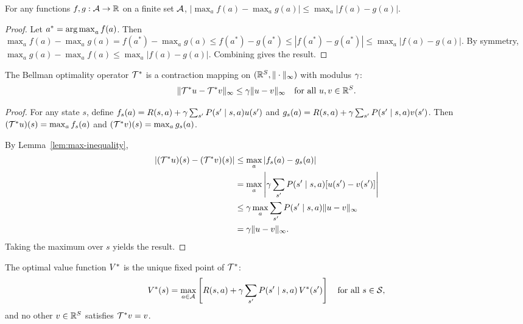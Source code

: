 \documentclass[11pt,a4paper]{article}
\begin{document}
\begin{lemma}
\label{lem:max-inequality}
For any functions $f, g : \mathcal{A} \to \mathbb{R}$ on a finite set $\mathcal{A}$,
$|\max_a f(a) - \max_a g(a)| \leq \max_a |f(a) - g(a)|$.
\end{lemma}

\begin{proof}
Let $a^* = \operatorname{arg\,max}_a f(a)$. Then
$\max_a f(a) - \max_a g(a) = f(a^*) - \max_a g(a) \leq
f(a^*) - g(a^*) \leq |f(a^*) - g(a^*)| \leq \max_a |f(a) - g(a)|$.
By symmetry, $\max_a g(a) - \max_a f(a) \leq \max_a |f(a) - g(a)|$.
Combining gives the result.
\end{proof}

\begin{theorem}
\label{thm:bellman-opt-contraction}
The Bellman optimality operator $\mathcal{T}^*$ is a contraction mapping
on $(\mathbb{R}^S, \|\cdot\|_\infty)$ with modulus $\gamma$:
\[
    \|\mathcal{T}^* u - \mathcal{T}^* v\|_\infty
    \leq \gamma \|u - v\|_\infty
    \quad \text{for all } u, v \in \mathbb{R}^S.
\]
\end{theorem}

\begin{proof}
For any state $s$, define $f_s(a) = R(s,a) + \gamma \sum_{s'}
P(s' \mid s,a) u(s')$ and $g_s(a) = R(s,a) + \gamma \sum_{s'}
P(s' \mid s,a) v(s')$. Then
$(\mathcal{T}^* u)(s) = \max_a f_s(a)$ and
$(\mathcal{T}^* v)(s) = \max_a g_s(a)$.

By Lemma~\ref{lem:max-inequality},
\begin{align*}
    |(\mathcal{T}^* u)(s) - (\mathcal{T}^* v)(s)|
    &\leq \max_a |f_s(a) - g_s(a)| \\
    &= \max_a \left| \gamma \sum_{s'}
       P(s' \mid s,a) [u(s') - v(s')] \right| \\
    &\leq \gamma \max_a \sum_{s'} P(s' \mid s,a)
       \|u - v\|_\infty \\
    &= \gamma \|u - v\|_\infty.
\end{align*}
Taking the maximum over $s$ yields the result.
\end{proof}

\begin{theorem}
\label{thm:bellman-opt-fixed-point}
The optimal value function $V^*$ is the unique fixed point of
$\mathcal{T}^*$:
\[
    V^*(s) = \max_{a \in \mathcal{A}}
    \left[ R(s,a) + \gamma \sum_{s'} P(s' \mid s,a)\, V^*(s')
    \right] \quad \text{for all } s \in \mathcal{S},
\]
and no other $v \in \mathbb{R}^S$ satisfies $\mathcal{T}^* v = v$.
\end{theorem}
\end{document}
